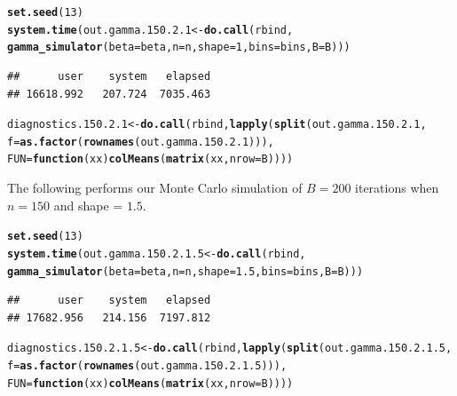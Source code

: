 \documentclass[11pt]{article}\usepackage[]{graphicx}\usepackage[]{color}
\makeatletter
\newcommand{\hlnum}[1]{\textcolor[rgb]{0.686,0.059,0.569}{#1}}%
\newcommand{\hlstd}[1]{\textcolor[rgb]{0.345,0.345,0.345}{#1}}%
\newcommand{\hlkwa}[1]{\textcolor[rgb]{0.161,0.373,0.58}{\textbf{#1}}}%
\newcommand{\hlkwb}[1]{\textcolor[rgb]{0.69,0.353,0.396}{#1}}%
\newcommand{\hlkwc}[1]{\textcolor[rgb]{0.333,0.667,0.333}{#1}}%
\newcommand{\hlkwd}[1]{\textcolor[rgb]{0.737,0.353,0.396}{\textbf{#1}}}%
\newenvironment{kframe}{%
 \def\at@end@of@kframe{}%
 \ifinner\ifhmode%
  \def\at@end@of@kframe{\end{minipage}}%
  \begin{minipage}{\columnwidth}%
 \fi\fi%
 \def\FrameCommand##1{\hskip\@totalleftmargin \hskip-\fboxsep
 \colorbox{shadecolor}{##1}\hskip-\fboxsep
     \hskip-\linewidth \hskip-\@totalleftmargin \hskip\columnwidth}%
 \MakeFramed {\advance\hsize-\width
   \@totalleftmargin\z@ \linewidth\hsize
   \@setminipage}}%
 {\par\unskip\endMakeFramed%
 \at@end@of@kframe}
\newenvironment{knitrout}{}{} %
\makeatother
\begin{document}
\begin{knitrout}
\color{fgcolor}\begin{kframe}
\begin{alltt}
\hlkwd{set.seed}\hlstd{(}\hlnum{13}\hlstd{)}
\hlkwd{system.time}\hlstd{(out.gamma.150.2.1} \hlkwb{<-} \hlkwd{do.call}\hlstd{(rbind,}
  \hlkwd{gamma_simulator}\hlstd{(}\hlkwc{beta} \hlstd{= beta,} \hlkwc{n} \hlstd{= n,} \hlkwc{shape} \hlstd{=} \hlnum{1}\hlstd{,} \hlkwc{bins} \hlstd{= bins,} \hlkwc{B} \hlstd{= B)))}
\end{alltt}
\begin{verbatim}
##      user    system   elapsed 
## 16618.992   207.724  7035.463
\end{verbatim}
\begin{alltt}
\hlstd{diagnostics.150.2.1} \hlkwb{<-} \hlkwd{do.call}\hlstd{(rbind,} \hlkwd{lapply}\hlstd{(}\hlkwd{split}\hlstd{(out.gamma.150.2.1,}
  \hlkwc{f} \hlstd{=} \hlkwd{as.factor}\hlstd{(}\hlkwd{rownames}\hlstd{(out.gamma.150.2.1))),}
  \hlkwc{FUN} \hlstd{=} \hlkwa{function}\hlstd{(}\hlkwc{xx}\hlstd{)} \hlkwd{colMeans}\hlstd{(}\hlkwd{matrix}\hlstd{(xx,} \hlkwc{nrow} \hlstd{= B))))}
\end{alltt}
\end{kframe}
\end{knitrout}




The following performs our Monte Carlo simulation of $B = 200$ iterations 
when $n = 150$ and shape = $1.5$.

\begin{knitrout}
\color{fgcolor}\begin{kframe}
\begin{alltt}
\hlkwd{set.seed}\hlstd{(}\hlnum{13}\hlstd{)}
\hlkwd{system.time}\hlstd{(out.gamma.150.2.1.5} \hlkwb{<-} \hlkwd{do.call}\hlstd{(rbind,}
  \hlkwd{gamma_simulator}\hlstd{(}\hlkwc{beta} \hlstd{= beta,} \hlkwc{n} \hlstd{= n,} \hlkwc{shape} \hlstd{=} \hlnum{1.5}\hlstd{,} \hlkwc{bins} \hlstd{= bins,} \hlkwc{B} \hlstd{= B)))}
\end{alltt}
\begin{verbatim}
##      user    system   elapsed 
## 17682.956   214.156  7197.812
\end{verbatim}
\begin{alltt}
\hlstd{diagnostics.150.2.1.5} \hlkwb{<-} \hlkwd{do.call}\hlstd{(rbind,} \hlkwd{lapply}\hlstd{(}\hlkwd{split}\hlstd{(out.gamma.150.2.1.5,}
  \hlkwc{f} \hlstd{=} \hlkwd{as.factor}\hlstd{(}\hlkwd{rownames}\hlstd{(out.gamma.150.2.1.5))),}
  \hlkwc{FUN} \hlstd{=} \hlkwa{function}\hlstd{(}\hlkwc{xx}\hlstd{)} \hlkwd{colMeans}\hlstd{(}\hlkwd{matrix}\hlstd{(xx,} \hlkwc{nrow} \hlstd{= B))))}
\end{alltt}
\end{kframe}
\end{knitrout}
\end{document}

